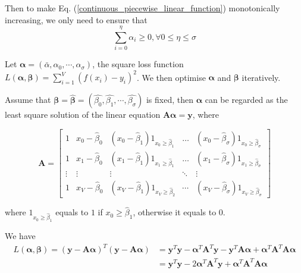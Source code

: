 Then to make Eq. (\ref{continuous_piecewise_linear_function}) monotonically increasing, we only need to ensure that $$\sum_{i=0}^\eta \alpha_i\geq 0, \forall 0\leq \eta\leq \sigma$$

Let $\boldsymbol{\alpha}=(\bar{\alpha},\alpha_0,\cdots,\alpha_\sigma)$, the square loss function $L(\boldsymbol{\alpha},\boldsymbol{\beta})=\sum_{i=1}^{V}(f(x_i)-y_i)^2$. We then optimise $\boldsymbol{\alpha}$ and $\boldsymbol{\beta}$ iteratively.

Assume that $\boldsymbol{\beta}=\hat{\boldsymbol{\beta}}=(\hat{\beta_0},\hat{\beta_1},\cdots,\hat{\beta_\sigma})$ is fixed, then $\boldsymbol{\alpha}$ can be regarded as the least square solution of the linear equation $\boldsymbol{A\alpha}=\boldsymbol{y}$, where

$$
\boldsymbol{A}=\left[\begin{array}{ccccc}
1 & x_{0}-\hat{\beta}_{0} & \left(x_{0}-\hat{\beta}_{1}\right) 1_{x_{0} \geq \hat{\beta}_{1}} & \ldots & \left(x_{0}-\hat{\beta}_{\sigma}\right) 1_{x_{0} \geq \hat{\beta}_{\sigma}} \\
1 & x_{1}-\hat{\beta}_{0} & \left(x_{1}-\hat{\beta}_{1}\right) 1_{x_{1} \geq \hat{\beta}_{1}} & \ldots & \left(x_{1}-\hat{\beta}_{\sigma}\right) 1_{x_{1} \geq \hat{\beta}_{\sigma}} \\
\vdots & \vdots & \vdots & \ddots & \vdots \\
1 & x_{V}-\hat{\beta}_{0} & \left(x_{V}-\hat{\beta}_{1}\right) 1_{x_{V} \geq \hat{\beta}_{2}} & \cdots & \left(x_{V}-\hat{\beta}_{\sigma}\right) 1_{x_{V} \geq \hat{\beta}_{\sigma}}
\end{array}\right]$$

where $1_{x_{0} \geq \hat{\beta}_{1}}$ equals to $1$ if ${x_{0} \geq \hat{\beta}_{1}}$, otherwise it equals to $0$.

We have
\begin{equation}
 \begin{split}
	L(\boldsymbol{\alpha},\boldsymbol{\beta}) 
	 =(\boldsymbol{y-A\alpha})^T(\boldsymbol{y-A\alpha}) 
	&=\boldsymbol{y}^T\boldsymbol{y}-\boldsymbol{\alpha}{^T}\boldsymbol{A}^T\boldsymbol{y}-\boldsymbol{y}^T\boldsymbol{A\alpha}+\boldsymbol{\alpha}^T\boldsymbol{A}^T\boldsymbol{A\alpha} \\
	& = \boldsymbol{y}^T\boldsymbol{y}-2\boldsymbol{\alpha}^T\boldsymbol{A}^T\boldsymbol{y}+\boldsymbol{\alpha}^T\boldsymbol{A}^T\boldsymbol{A}\boldsymbol{\alpha}
\end{split}
\end{equation}

